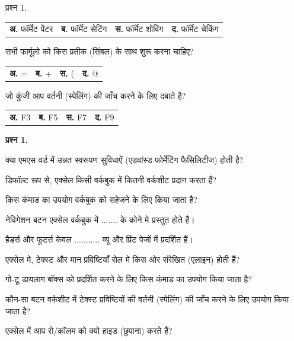 \begin{descriptionSimple}{प्रश्न 1.}
		\begin{tabular}{llll}
		\textbf{अ.}  फॉर्मेट पेंटर & 
		\textbf{ब.} फॉर्मेट सेटिंग &
		\textbf{स.} फॉर्मेट शोविंग &
		\textbf{द.} फॉर्मेट चेकिंग 
		\end{tabular}
\item[\textbf{प्रश्न 6.}] सभी फार्मूलो को किस प्रतीक (सिंबल) के साथ शुरू करना चाहिए?

		\begin{tabular}{llll}
		\textbf{अ.}  =  & 
		\textbf{ब.}  +  &
		\textbf{स.} (  &
		\textbf{द.} @ 
		\end{tabular}
\item[\textbf{प्रश्न 7}] जो कुंजी आप वर्तनी (स्पेलिंग) की जाँच करने के लिए दबाते है?

		\begin{tabular}{llll}
		\textbf{अ.}  F3 &
		\textbf{ब.} F5 &
		\textbf{स.} F7 &
		\textbf{द.} F9
		\end{tabular}
\end{descriptionSimple}

\begin{descriptionSimple}{\textbf{प्रश्न 1.}}
\item[\textbf{प्रश्न 1}] क्या एमएस वर्ड में उन्नत स्वरूपण सुविधाऐं (एडवांस्ड फोर्मेटिंग फैसिलिटीज) होती है?
\item[\textbf{प्रश्न 2}] डिफॉल्ट रूप से, एक्सेल किसी वर्कबुक में कितनी वर्कशीट प्रदान करता हैं?
\item[\textbf{प्रश्न 3}] किस कंमाड का उपयोग वर्कबुक को सहेजने के लिए किया जाता है?
\item[\textbf{प्रश्न 4}] नेविगेशन बटन एक्सेल वर्कबुक में ....... के कोने मे प्रस्तुत होते हैं।
\item[\textbf{प्रश्न 5}] हैडर्स और फूटर्स केवल ........... व्यू और प्रिंट पेजों में प्रदर्शित हैं।
\item[\textbf{प्रश्न 6}] एक्सेल मे, टेक्स्ट और मान प्रविष्टियाँ सेल मे किस ओर संरेखित (एलाइन) होती हैं?
\item[\textbf{प्रश्न 7}] गो-टू डायलाग बॉक्स को प्रदर्शित करने के लिए किस कंमाड का उपयोग किया जाता है?
\item[\textbf{प्रश्न 8}] कौन-सा बटन वर्कशीट में टेक्स्ट प्रविष्टियों की वर्तनी (स्पेलिंग) की जाँच करने के लिए उपयोग किया जाता है?
\item[\textbf{प्रश्न 9}] एक्सेल में आप रो/कॉलम को क्यो हाइड (छुपाना) करते हैं?
\end{descriptionSimple}
\smallskip

